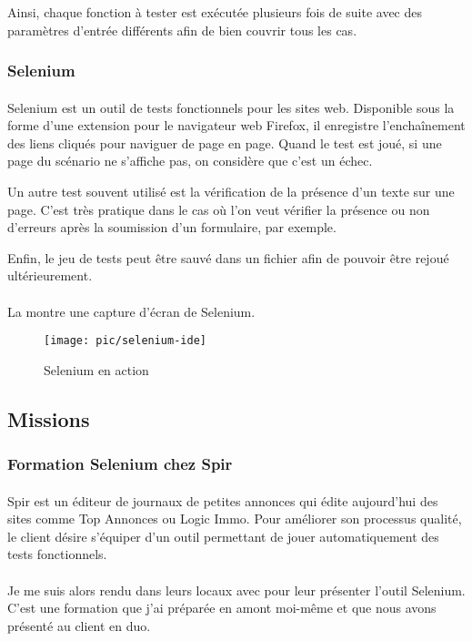 Ainsi, chaque fonction à tester est exécutée plusieurs fois de suite avec des paramètres d'entrée différents afin de bien couvrir tous les cas.



\subsubsection{Selenium}

\paragraph{}
Selenium est un outil de tests fonctionnels pour les sites web.
Disponible sous la forme d'une extension pour le navigateur web Firefox, il enregistre l'enchaînement des liens cliqués pour naviguer de page en page.
Quand le test est joué, si une page du scénario ne s'affiche pas, on considère que c'est un échec.

Un autre test souvent utilisé est la vérification de la présence d'un texte sur une page.
C'est très pratique dans le cas où l'on veut vérifier la présence ou non d'erreurs après la soumission d'un formulaire, par exemple.

Enfin, le jeu de tests peut être sauvé dans un fichier afin de pouvoir être rejoué ultérieurement.

\paragraph{}
La  montre une capture d'écran de Selenium.

\begin{figure}
	\centering
	\texttt{[image: pic/selenium-ide]}
	\caption{Selenium en action}
	\label{figure:pic-tests:selenium}
\end{figure}



\subsection{Missions}

\subsubsection{Formation Selenium chez Spir}

\paragraph{}
Spir est un éditeur de journaux de petites annonces qui édite aujourd'hui des sites \ainternet{} comme Top Annonces ou Logic Immo.
Pour améliorer son processus qualité, le client désire s'équiper d'un outil permettant de jouer automatiquement des tests fonctionnels.

\paragraph{}
Je me suis alors rendu dans leurs locaux avec \agulet{} pour leur présenter l'outil Selenium.
C'est une formation que j'ai préparée en amont moi-même et que nous avons présenté au client en duo.


